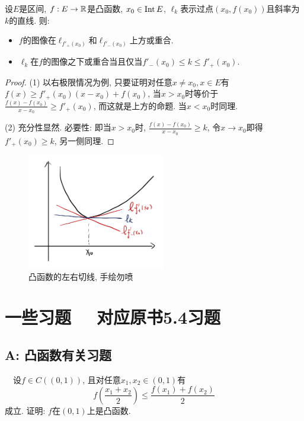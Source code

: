 \begin{proposition}{}
	设$E$是区间, $f:E \to \mathbb{R}$是凸函数, $x_0 \in \operatorname{Int} E$, $\ell _k$表示过点$(x_0,f(x_0))$且斜率为$k$的直线. 则: 
	\begin{itemize}
		\item $f$的图像在$\ell _{f'_+(x_0)}$和$\ell _{f'_-(x_0)}$上方或重合. 
		\item $\ell _k$在$f$的图像之下或重合当且仅当$f'_-(x_0) \leq k \leq f'_+(x_0)$. 
	\end{itemize}
\end{proposition}
\begin{proof}
	(1) 以右极限情况为例, 只要证明对任意$x\neq x_0,x \in E$有$f(x) \geq f'_+(x_0)(x-x_0)+f(x_0)$, 当$x>x_0$时等价于$\frac{f(x)-f(x_0)}{x-x_0} \geq f'_+(x_0)$, 而这就是上方的命题. 当$x<x_0$时同理. 
	
	(2) 充分性显然. 必要性: 即当$x>x_0$时, $\frac{f(x)-f(x_0)}{x-x_0} \geq k$, 令$x \to x_0$即得$f'_+(x_0) \geq k$, 另一侧同理. 
\end{proof}

\begin{figure}[H]
	\centering
	\includegraphics[width=6cm]{attachment/IMG_3552.jpg}
	\caption{凸函数的左右切线, 手绘勿喷}
\end{figure}

\newpage
\section*{一些习题 ~~\small 对应原书5.4习题} \label{sec:ex6.3}

\subsection*{A: 凸函数有关习题}

~~设$f\in C((0,1))$, 且对任意$x_1,x_2 \in (0,1)$有$$f\left(\frac{x_1+x_2}{2} \right) \leq \frac{f(x_1)+f(x_2)}{2}$$
成立. 证明: $f$在$(0,1)$上是凸函数. 
\vspace{1em}

